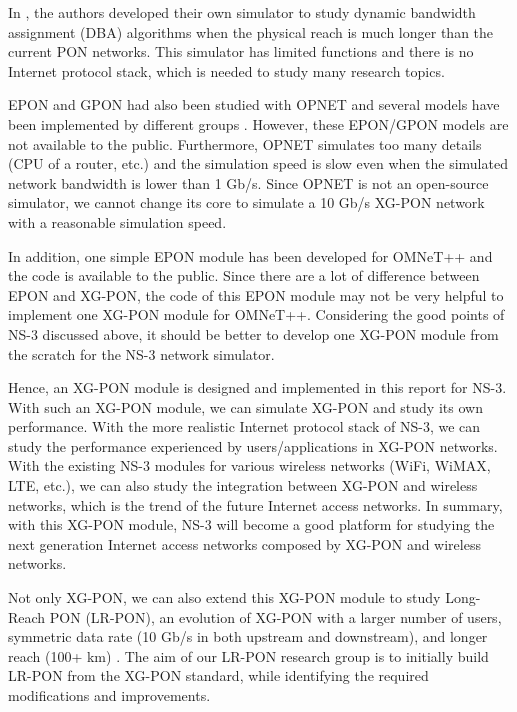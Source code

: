In \cite{song09multithread4LRPON}, the authors developed their own
simulator to study dynamic bandwidth assignment (DBA) algorithms
when the physical reach is much longer than the current PON
networks. This simulator has limited functions and there is no
Internet protocol stack, which is needed to study many research
topics.

EPON and GPON had also been studied with OPNET \cite{opnet} and
several models have been implemented by different groups
\cite{chang08dba4GEPON}\cite{peng11epon4opnet}. However, these
EPON/GPON models are not available to the public. Furthermore,
OPNET simulates too many details (CPU of a router, etc.) and the
simulation speed is slow even when the simulated network bandwidth
is lower than 1 Gb/s. Since OPNET is not an open-source simulator,
we cannot change its core to simulate a 10 Gb/s XG-PON network
with a reasonable simulation speed.


In addition, one simple EPON module has been developed for OMNeT++
\cite{bodozoglou10epon4omnet} and the code is available to the
public. Since there are a lot of difference between EPON and
XG-PON, the code of this EPON module may not be very helpful to
implement one XG-PON module for OMNeT++. Considering the good
points of NS-3 discussed above, it should be better to develop one
XG-PON module from the scratch for the NS-3 network simulator.


Hence, an XG-PON module is designed and implemented in this report
for NS-3. With such an XG-PON module, we can simulate XG-PON and
study its own performance. With the more realistic Internet
protocol stack of NS-3, we can study the performance experienced
by users/applications in XG-PON networks. With the existing NS-3
modules for various wireless networks (WiFi, WiMAX, LTE, etc.), we
can also study the integration between XG-PON and wireless
networks, which is the trend of the future Internet access
networks. In summary, with this XG-PON module, NS-3 will become a
good platform for studying the next generation Internet access
networks composed by XG-PON and wireless networks.

Not only XG-PON, we can also extend this XG-PON module to study
Long-Reach PON (LR-PON), an evolution of XG-PON with a larger
number of users, symmetric data rate (10 Gb/s in both upstream and
downstream), and longer reach (100+ km)
\cite{payne02lrpon}\cite{shea07lrpon10G1000onu}. The aim of our
LR-PON research group is to initially build LR-PON from the XG-PON
standard, while identifying the required modifications and
improvements.
